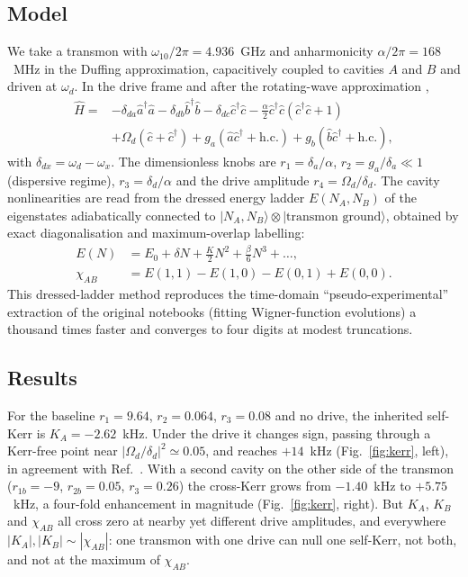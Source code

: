 \documentclass[aps,pra,reprint,superscriptaddress,amsmath,amssymb,nofootinbib]{revtex4-2}
\newcommand{\ket}[1]{|#1\rangle}
\begin{document}
\subsection{Model}
We take a transmon with $\omega_{10}/2\pi=4.936$~GHz and anharmonicity
$\alpha/2\pi=168$~MHz in the Duffing approximation, capacitively coupled to
cavities $A$ and $B$ and driven at $\omega_d$. In the drive frame and after the
rotating-wave approximation \cite{zhang2022},
\begin{align}
  \hat H={}&-\delta_{da}\hat a^\dagger\hat a-\delta_{db}\hat b^\dagger\hat b
  -\delta_{dc}\hat c^\dagger\hat c-\tfrac\alpha2\hat c^\dagger\hat c(\hat c^\dagger\hat c+1)\nonumber\\
  &+\Omega_d(\hat c+\hat c^\dagger)+g_a(\hat a\hat c^\dagger+\mathrm{h.c.})
  +g_b(\hat b\hat c^\dagger+\mathrm{h.c.}),
\end{align}
with $\delta_{dx}=\omega_d-\omega_x$. The dimensionless knobs are
$r_1=\delta_a/\alpha$, $r_2=g_a/\delta_a\ll1$ (dispersive regime),
$r_3=\delta_d/\alpha$ and the drive amplitude $r_4=\Omega_d/\delta_d$. The
cavity nonlinearities are read from the dressed energy ladder $E(N_A,N_B)$ of
the eigenstates adiabatically connected to
$\ket{N_A,N_B}\otimes\ket{\text{transmon ground}}$, obtained by exact
diagonalisation and maximum-overlap labelling:
\begin{align}
  E(N)&=E_0+\delta N+\tfrac K2N^2+\tfrac\beta6N^3+\dots,\\
  \chi_{AB}&=E(1,1)-E(1,0)-E(0,1)+E(0,0).
\end{align}
This dressed-ladder method reproduces the time-domain ``pseudo-experimental''
extraction of the original notebooks (fitting Wigner-function evolutions) a
thousand times faster and converges to four digits at modest truncations.

\subsection{Results}
For the baseline $r_1=9.64$, $r_2=0.064$, $r_3=0.08$ and no drive, the
inherited self-Kerr is $K_A=-2.62$~kHz. Under the drive it changes sign,
passing through a Kerr-free point near $|\Omega_d/\delta_d|^2\simeq0.05$, and
reaches $+14$~kHz (Fig.~\ref{fig:kerr}, left), in agreement with
Ref.~\cite{zhang2022}. With a second cavity on the other side of the transmon
($r_{1b}=-9$, $r_{2b}=0.05$, $r_3=0.26$) the cross-Kerr grows from
$-1.40$~kHz to $+5.75$~kHz, a four-fold enhancement in magnitude
(Fig.~\ref{fig:kerr}, right). But $K_A$, $K_B$ and $\chi_{AB}$ all cross zero
at nearby yet different drive amplitudes, and everywhere
$|K_A|,|K_B|\sim|\chi_{AB}|$: one transmon with one drive can null one
self-Kerr, not both, and not at the maximum of $\chi_{AB}$.
\end{document}
